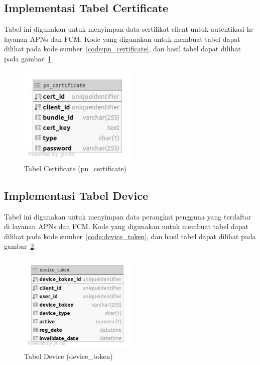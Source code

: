 \subsection{Implementasi Tabel Certificate}
\par Tabel ini digunakan untuk menyimpan data sertifikat client untuk autentikasi ke layanan APNs dan FCM. Kode yang digunakan untuk membuat tabel dapat dilihat pada kode sumber~\ref{code:pn_certificate}, dan hasil tabel dapat dilihat pada gambar~\ref{tabel_pn_certificate}.

\begin{figure}[H]
    \centering\includegraphics[width=0.5\textwidth]{bab4/figures/tabel_pn_certificate.jpg}
    \caption{Tabel Certificate (pn\_certificate)}
    \label{tabel_pn_certificate}
\end{figure}

\subsection{Implementasi Tabel Device}
\par Tabel ini digunakan untuk menyimpan data perangkat pengguna yang terdaftar di layanan APNs dan FCM. Kode yang digunakan untuk membuat tabel dapat dilihat pada kode sumber~\ref{code:device_token}, dan hasil tabel dapat dilihat pada gambar~\ref{tabel_device_token}.

\begin{figure}[H]
    \centering\includegraphics[width=0.5\textwidth]{bab4/figures/tabel_device_token.jpg}
    \caption{Tabel Device (device\_token)}
    \label{tabel_device_token}
\end{figure}

